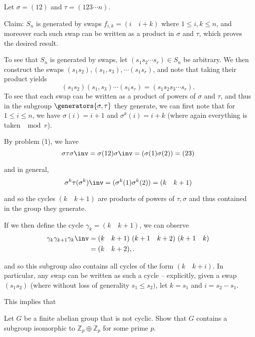 \begin{solution}
  Let $\sigma= (12)$ and $\tau= (123\cdots n)$.

  Claim: $S_n$ is generated by swaps $f_{i, k} = (i \quad i+k)$ where  $1 \leq i, k \leq n$, and moreover each such swap can be written as a product in $\sigma$ and $\tau$, which proves the desired result.

  To see that $S_n$ is generated by swaps, let $(s_1 s_2 \cdots s_r) \in S_n$ be arbitrary. We then construct the swaps $(s_1 s_2), (s_1, s_3), \cdots (s_1 s_r)$, and note that taking their product yields
  $$
  (s_1 s_2)(s_1, s_3)\cdots(s_1 s_r) = (s_1 s_2 s_3 \cdots s_r).
  $$
  To see that each swap can be written as a product of powers of $\sigma$ and $\tau$, and thus in the subgroup $\generators{\sigma, \tau}$ they generate, we can first note that for $1 \leq i \leq n$, we have $\sigma(i) = i+1$ and $\sigma^k(i) = i+k$ (where again everything is taken $\mod r$).

  By problem (1), we have
  $$
  \sigma\tau\sigma\inv = \sigma(1 2)\sigma\inv = (\sigma(1) \sigma(2)) = (2 3)
  $$

  and in general,
  $$
  \sigma^k\tau (\sigma^k)\inv = (\sigma^k(1) \sigma^k(2)) = (k\quad k+1)
  $$

  and so the cycles $(k\quad k+1)$ are products of powers of $\tau, \sigma$ and thus contained in the group they generate.

  If we then define the cycle $\gamma_k = (k\quad k+1)$, we can observe
  \begin{align*}
    \gamma_k \gamma_{k+1}\gamma_{k}\inv &= (k\quad k+1)~(k+1\quad k+2)~(k+1 \quad k) \\
    &= (k\quad k+2),
  .\end{align*}

  and so this subgroup also contains all cycles of the form $(k\quad k+i)$. In particular, any swap can be written as such a cycle -- explicitly, given a swap $(s_1 s_2)$ (where without loss of generality $s_1 \leq s_2)$, let $k=s_1$ and $i = s_2 - s_1$.

  This implies that

\end{solution}

\begin{problem}[Hungerford 2.2.1]
\label{prob:1.3}
Let $G$ be a finite abelian group that is not cyclic. Show that $G$ contains a subgroup isomorphic to $\mathbb{Z}_p \oplus \mathbb{Z}_p$ for some prime $p$.
\end{problem}

